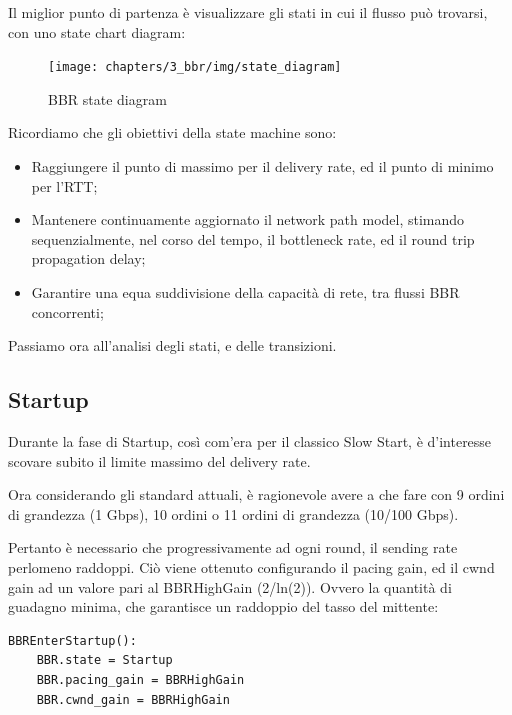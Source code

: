 Il miglior punto di partenza è visualizzare gli stati in cui il flusso può trovarsi, con uno state chart diagram:

\begin{figure}[H]

\center
\caption{BBR state diagram}
\texttt{[image: chapters/3\_bbr/img/state\_diagram]}

\end{figure}

Ricordiamo che gli obiettivi della state machine sono:

\begin{itemize}

\item Raggiungere il punto di massimo per il delivery rate, ed il punto di minimo per l'RTT;

\item Mantenere continuamente aggiornato il network path model, stimando sequenzialmente, nel corso del tempo, il bottleneck rate, ed il round trip propagation delay;

\item Garantire una equa suddivisione della capacità di rete, tra flussi BBR concorrenti;

\end{itemize}

Passiamo ora all'analisi degli stati, e delle transizioni.

\subsection{Startup}

Durante la fase di Startup, così com'era per il classico Slow Start, è d'interesse scovare subito il limite massimo del delivery rate. \bigskip

Ora considerando gli standard attuali, è ragionevole avere a che fare con 9 ordini di grandezza (1 Gbps), 10 ordini o 11 ordini di grandezza (10/100 Gbps). \bigskip

Pertanto è necessario che progressivamente ad ogni round, il sending rate perlomeno raddoppi. Ciò viene ottenuto configurando il pacing gain, ed il cwnd gain ad un valore pari al BBRHighGain (2/ln(2)). Ovvero la quantità di guadagno minima, che garantisce un raddoppio del tasso del mittente:

\begin{lstlisting}[caption=BBREnterStartup]
BBREnterStartup():
	BBR.state = Startup
	BBR.pacing_gain = BBRHighGain
	BBR.cwnd_gain = BBRHighGain

\end{lstlisting}

